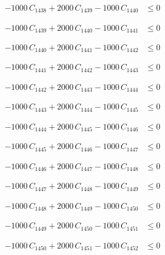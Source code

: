 \documentclass[a4paper,11pt]{article}
\begin{document}
\begin{align}
-1000\,C_{1438} + 2000\,C_{1439} - 1000\,C_{1440} &\leq 0 \nonumber
\end{align}

\begin{align}
-1000\,C_{1439} + 2000\,C_{1440} - 1000\,C_{1441} &\leq 0 \nonumber
\end{align}

\begin{align}
-1000\,C_{1440} + 2000\,C_{1441} - 1000\,C_{1442} &\leq 0 \nonumber
\end{align}

\begin{align}
-1000\,C_{1441} + 2000\,C_{1442} - 1000\,C_{1443} &\leq 0 \nonumber
\end{align}

\begin{align}
-1000\,C_{1442} + 2000\,C_{1443} - 1000\,C_{1444} &\leq 0 \nonumber
\end{align}

\begin{align}
-1000\,C_{1443} + 2000\,C_{1444} - 1000\,C_{1445} &\leq 0 \nonumber
\end{align}

\begin{align}
-1000\,C_{1444} + 2000\,C_{1445} - 1000\,C_{1446} &\leq 0 \nonumber
\end{align}

\begin{align}
-1000\,C_{1445} + 2000\,C_{1446} - 1000\,C_{1447} &\leq 0 \nonumber
\end{align}

\begin{align}
-1000\,C_{1446} + 2000\,C_{1447} - 1000\,C_{1448} &\leq 0 \nonumber
\end{align}

\begin{align}
-1000\,C_{1447} + 2000\,C_{1448} - 1000\,C_{1449} &\leq 0 \nonumber
\end{align}

\begin{align}
-1000\,C_{1448} + 2000\,C_{1449} - 1000\,C_{1450} &\leq 0 \nonumber
\end{align}

\begin{align}
-1000\,C_{1449} + 2000\,C_{1450} - 1000\,C_{1451} &\leq 0 \nonumber
\end{align}

\begin{align}
-1000\,C_{1450} + 2000\,C_{1451} - 1000\,C_{1452} &\leq 0 \nonumber
\end{align}
\end{document}
